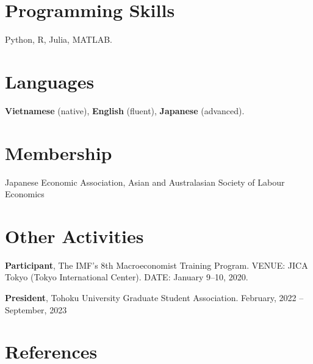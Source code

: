 \documentclass[12pt]{article}
\begin{document}
%
%
%
%

\section{Programming Skills}

Python, R, Julia, MATLAB.

\section{Languages}

\textbf{Vietnamese} (native), \textbf{English} (fluent), \textbf{Japanese} (advanced).

\section{Membership}

Japanese Economic Association, Asian and Australasian Society of Labour Economics

\section{Other Activities}

\textbf{Participant}, The IMF's 8th Macroeconomist Training Program. VENUE: JICA Tokyo (Tokyo International Center). DATE: January 9--10, 2020.

\textbf{President}, Tohoku University Graduate Student Association. February, 2022 -- September, 2023

\section{\sc References}
\end{document}
